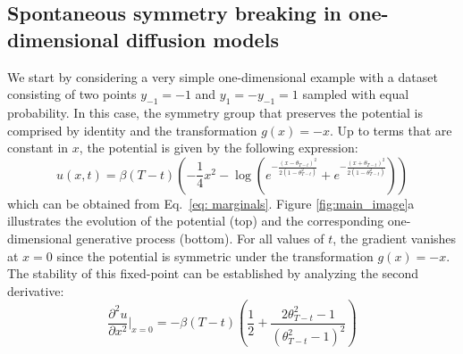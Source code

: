 \documentclass{article}
\begin{document}
\subsection{Spontaneous symmetry breaking in one-dimensional diffusion models}
\label{sec:symmetry_breaking}


We start by considering a very simple one-dimensional example with a dataset consisting of two points $y_{-1} = -1$ and $y_1 = -y_{-1} = 1$ sampled with equal probability. In this case, the symmetry group that preserves the potential is comprised by identity and the transformation $g(x) = -x$. Up to terms that are constant in $x$, the potential is given by the following expression:
\begin{equation}
    u(x, t) = \beta(T - t) \left( -\frac{1}{4} x^2 -  \log{\left(e^{-\frac{(x - \theta_{T-t})^2}{2 (1 - \theta_{T-t}^2)}} + e^{-\frac{(x + \theta_{T-t})^2}{2 (1 - \theta_{T-t}^2)}} \right)} \right)
\end{equation}
which can be obtained from Eq.~\ref{eq: marginals}. Figure \ref{fig:main_image}a illustrates the evolution of the potential (top) and the corresponding one-dimensional generative process (bottom). For all values of $t$, the gradient vanishes at $x = 0$ since the potential is symmetric under the transformation $g(x) = - x$. The stability of this fixed-point can be established by analyzing the second derivative:
\begin{equation}
    \frac{\partial^2 u}{\partial x^2}\bigg|_{x=0} = - \beta(T -t) \left( \frac{1}{2} + \frac{2 \theta_{T-t}^2 - 1}{(\theta_{T-t}^2 - 1)^2} \right)
\end{equation}
\end{document}
